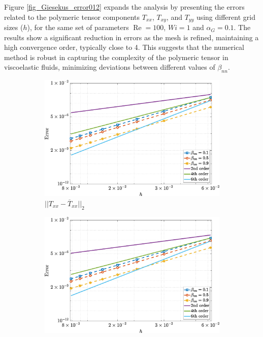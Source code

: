 \documentclass[preprint, 12pt]{elsarticle}
\begin{document}
Figure \ref{fig_Giesekus_error012} expands the analysis by presenting the errors related to the polymeric tensor components $T_{xx}$, $T_{xy}$, and $T_{yy}$ using different grid sizes ($h$), for the same set of parameters $\operatorname{Re} = 100$, $Wi = 1$ and $\alpha_G = 0.1$. The results show a significant reduction in errors as the mesh is refined, maintaining a high convergence order, typically close to 4. This suggests that the numerical method is robust in capturing the complexity of the polymeric tensor in viscoelastic fluids, minimizing deviations between different values of $\beta_{nn}$.
\begin{figure}[H]
    \centering  
    \begin{subfigure}[b]{.46\textwidth}
        \includegraphics[width=\textwidth]{NormErr_2nd_Re_100_Wi_1_epsilon_0_xi_0_alphaG_0.1_Dt_1e-06_at_0.05_tipsim_1_MMS_12_Txx.eps}
        \caption{$||T_{xx} - \overline{T}_{xx}||_{2}$}
        \label{error_txx_2nd_Case1_giesekus_alphaG_0.1}
    \end{subfigure}
    \vspace{0.2cm}
    \qquad
    \begin{subfigure}[b]{.46\textwidth}
        \includegraphics[width=\textwidth]{NormErr_2nd_Re_100_Wi_1_epsilon_0_xi_0_alphaG_0.1_Dt_1e-06_at_0.05_tipsim_1_MMS_12_Txy.eps}

\end{subfigure}
\end{figure}
\end{document}
